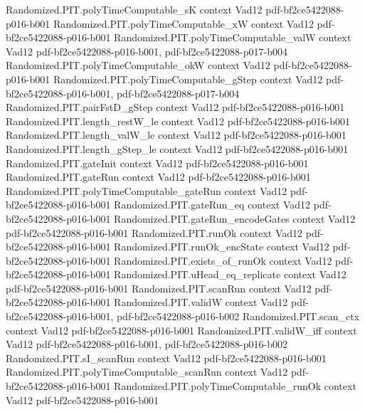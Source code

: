 \begin{theorem}
\proofstep
  {Randomized.PIT.polyTimeComputable_sK}
  {context}
  {Vad12}
  {pdf-bf2ce5422088-p016-b001}
\proofstep
  {Randomized.PIT.polyTimeComputable_xW}
  {context}
  {Vad12}
  {pdf-bf2ce5422088-p016-b001}
\proofstep
  {Randomized.PIT.polyTimeComputable_valW}
  {context}
  {Vad12}
  {pdf-bf2ce5422088-p016-b001,
    pdf-bf2ce5422088-p017-b004}
\proofstep
  {Randomized.PIT.polyTimeComputable_okW}
  {context}
  {Vad12}
  {pdf-bf2ce5422088-p016-b001}
\proofstep
  {Randomized.PIT.polyTimeComputable_gStep}
  {context}
  {Vad12}
  {pdf-bf2ce5422088-p016-b001,
    pdf-bf2ce5422088-p017-b004}
\proofstep
  {Randomized.PIT.pairFstD_gStep}
  {context}
  {Vad12}
  {pdf-bf2ce5422088-p016-b001}
\proofstep
  {Randomized.PIT.length_restW_le}
  {context}
  {Vad12}
  {pdf-bf2ce5422088-p016-b001}
\proofstep
  {Randomized.PIT.length_valW_le}
  {context}
  {Vad12}
  {pdf-bf2ce5422088-p016-b001}
\proofstep
  {Randomized.PIT.length_gStep_le}
  {context}
  {Vad12}
  {pdf-bf2ce5422088-p016-b001}
\proofstep
  {Randomized.PIT.gateInit}
  {context}
  {Vad12}
  {pdf-bf2ce5422088-p016-b001}
\proofstep
  {Randomized.PIT.gateRun}
  {context}
  {Vad12}
  {pdf-bf2ce5422088-p016-b001}
\proofstep
  {Randomized.PIT.polyTimeComputable_gateRun}
  {context}
  {Vad12}
  {pdf-bf2ce5422088-p016-b001}
\proofstep
  {Randomized.PIT.gateRun_eq}
  {context}
  {Vad12}
  {pdf-bf2ce5422088-p016-b001}
\proofstep
  {Randomized.PIT.gateRun_encodeGates}
  {context}
  {Vad12}
  {pdf-bf2ce5422088-p016-b001}
\proofstep
  {Randomized.PIT.runOk}
  {context}
  {Vad12}
  {pdf-bf2ce5422088-p016-b001}
\proofstep
  {Randomized.PIT.runOk_encState}
  {context}
  {Vad12}
  {pdf-bf2ce5422088-p016-b001}
\proofstep
  {Randomized.PIT.exists_of_runOk}
  {context}
  {Vad12}
  {pdf-bf2ce5422088-p016-b001}
\proofstep
  {Randomized.PIT.uHead_eq_replicate}
  {context}
  {Vad12}
  {pdf-bf2ce5422088-p016-b001}
\proofstep
  {Randomized.PIT.scanRun}
  {context}
  {Vad12}
  {pdf-bf2ce5422088-p016-b001}
\proofstep
  {Randomized.PIT.validW}
  {context}
  {Vad12}
  {pdf-bf2ce5422088-p016-b001,
    pdf-bf2ce5422088-p016-b002}
\proofstep
  {Randomized.PIT.scan_ctx}
  {context}
  {Vad12}
  {pdf-bf2ce5422088-p016-b001}
\proofstep
  {Randomized.PIT.validW_iff}
  {context}
  {Vad12}
  {pdf-bf2ce5422088-p016-b001,
    pdf-bf2ce5422088-p016-b002}
\proofstep
  {Randomized.PIT.sI_scanRun}
  {context}
  {Vad12}
  {pdf-bf2ce5422088-p016-b001}
\proofstep
  {Randomized.PIT.polyTimeComputable_scanRun}
  {context}
  {Vad12}
  {pdf-bf2ce5422088-p016-b001}
\proofstep
  {Randomized.PIT.polyTimeComputable_runOk}
  {context}
  {Vad12}
  {pdf-bf2ce5422088-p016-b001}

\end{theorem}
